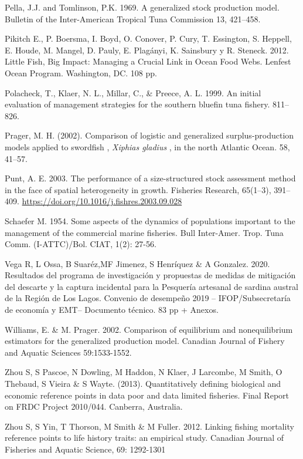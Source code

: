 \documentclass[
  spanish,
]{article}
\begin{document}
Pella, J.J. and Tomlinson, P.K. 1969. A generalized stock production
model. Bulletin of the Inter-American Tropical Tuna Commission 13,
421--458.

Pikitch E., P. Boersma, I. Boyd, O. Conover, P. Cury, T. Essington, S.
Heppell, E. Houde, M. Mangel, D. Pauly, E. Plagányi, K. Sainsbury y R.
Steneck. 2012. Little Fish, Big Impact: Managing a Crucial Link in Ocean
Food Webs. Lenfest Ocean Program. Washington, DC. 108 pp.

Polacheck, T., Klaer, N. L., Millar, C., \& Preece, A. L. 1999. An
initial evaluation of management strategies for the southern bluefin
tuna fishery. 811--826.

Prager, M. H. (2002). Comparison of logistic and generalized
surplus-production models applied to swordfish , \emph{Xiphias gladius}
, in the north Atlantic Ocean. 58, 41--57.

Punt, A. E. 2003. The performance of a size-structured stock assessment
method in the face of spatial heterogeneity in growth. Fisheries
Research, 65(1--3), 391--409.
\url{https://doi.org/10.1016/j.fishres.2003.09.028}

Schaefer M. 1954. Some aspects of the dynamics of populations important
to the management of the commercial marine fisheries. Bull Inter-Amer.
Trop. Tuna Comm. (I-ATTC)/Bol. CIAT, 1(2): 27-56.

Vega R, L Ossa, B Suaréz,MF Jimenez, S Henríquez \& A Gonzalez. 2020.
Resultados del programa de investigación y propuestas de medidas de
mitigación del descarte y la captura incidental para la Pesquería
artesanal de sardina austral de la Región de Los Lagos. Convenio de
desempeño 2019 -- IFOP/Subsecretaría de economía y EMT-- Documento
técnico. 83 pp + Anexos.

Williams, E. \& M. Prager. 2002. Comparison of equilibrium and
nonequilibrium estimators for the generalized production model. Canadian
Journal of Fishery and Aquatic Sciences 59:1533-1552.

Zhou S, S Pascoe, N Dowling, M Haddon, N Klaer, J Larcombe, M Smith, O
Thebaud, S Vieira \& S Wayte. (2013). Quantitatively defining biological
and economic reference points in data poor and data limited fisheries.
Final Report on FRDC Project 2010/044. Canberra, Australia.

Zhou S, S Yin, T Thorson, M Smith \& M Fuller. 2012. Linking fishing
mortality reference points to life history traits: an empirical study.
Canadian Journal of Fisheries and Aquatic Science, 69: 1292-1301
\end{document}
